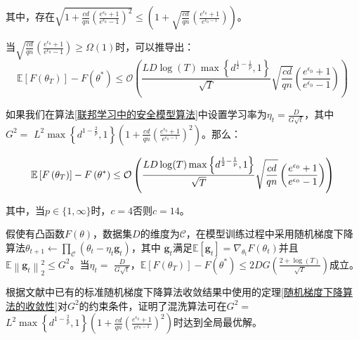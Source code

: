其中，存在$\sqrt{1+\frac{c d}{q n}\left(\frac{e^{\epsilon_{0}}+1}{e^{\epsilon_{0}}-1}\right)^{2}} \leq\left(1+\sqrt{\frac{c d}{q n}}\left(\frac{e^{\epsilon_{0}}+1}{e^{\epsilon_{0}-1}}\right)\right)$。

当$\sqrt{\frac{c d}{q n}}\left(\frac{e^{\epsilon_{0}}+1}{e^{\epsilon_{0}}-1}\right) \geq \Omega(1)$时，可以推导出：
\begin{equation}\label{eq:模型收敛性证明3}
\mathbb{E}\left[F\left(\theta_{T}\right)\right]-F\left(\theta^{*}\right) \leq \mathcal{O}\left(\frac{L D \log (T) \max \left\{d^{\frac{1}{2}-\frac{1}{p}}, 1\right\}}{\sqrt{T}} \sqrt{\frac{c d}{q n}}\left(\frac{e^{\epsilon_{0}}+1}{e^{\epsilon_{0}}-1}\right)\right)
\end{equation}

如果我们在算法\ref{联邦学习中的安全模型算法}中设置学习率为$\eta_{t}=\frac{D}{G \sqrt{t}}$，其中\\$G^{2}=$ $L^{2} \max \left\{d^{1-\frac{2}{p}}, 1\right\}\left(1+\frac{c d}{q n}\left(\frac{e^{\epsilon_{0}}+1}{e^{\epsilon_{0}-1}}\right)^{2}\right)$。那么：

\begin{equation}\label{eq:模型收敛性证明4}
\mathbb{E}\left[F\left(\theta_{T}\right)\right]-F\left(\theta^{*}\right) \leq \\
\mathcal{O}\left(\frac{L D \log (T) \max \left\{d^{\frac{1}{2}-\frac{1}{p}}, 1\right\}}{\sqrt{T}} \sqrt{\frac{c d}{q n}}\left(\frac{e^{\epsilon_{0}}+1}{e^{\epsilon_{0}}-1}\right)\right)
\end{equation}

其中，当$p \in\{1, \infty\}$时，$c=4$否则$c=14$。

\begin{theorem}[随机梯度下降算法的收敛性]\label{随机梯度下降算法的收敛性}
假使有凸函数$F(\theta)$，数据集$D$的维度为$\mathcal{C}$，在模型训练过程中采用随机梯度下降算法$\theta_{t+1} \leftarrow \prod_{\mathcal{C}}\left(\theta_{t}-\eta_{t} \mathbf{g}_{t}\right)$，其中 $\mathbf{g}_{t}$满足$\mathbb{E}\left[\mathbf{g}_{t}\right]=\nabla_{\theta_{t}} F\left(\theta_{t}\right)$并且$\mathbb{E}\left\|\mathbf{g}_{t}\right\|_{2}^{2} \leq G^{2}$。当$\eta_{t}=$ $\frac{D}{G \sqrt{t}}$，$\mathbb{E}\left[F\left(\theta_{T}\right)\right]-F\left(\theta^{*}\right) \leq 2 D G\left(\frac{2+\log (T)}{\sqrt{T}}\right)$成立。
\end{theorem}

根据文献中已有的标准随机梯度下降算法收敛结果中使用的定理\ref{随机梯度下降算法的收敛性}对$G^{2}$的约束条件，证明了混洗算法可在$G^{2}=$ $L^{2} \max \left\{d^{1-\frac{2}{p}}, 1\right\}\left(1+\frac{c d}{q n}\left(\frac{e^{\epsilon_{0}}+1}{e^{\epsilon_{0}-1}}\right)^{2}\right)$时达到全局最优解。


